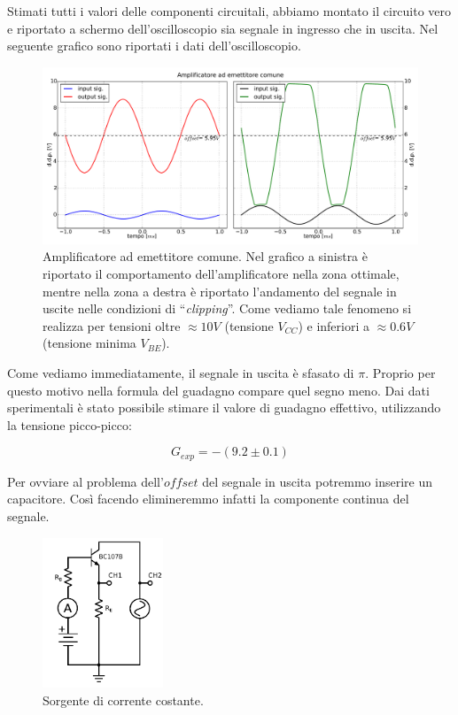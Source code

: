 Stimati tutti i valori delle componenti circuitali, abbiamo montato il circuito vero e riportato a schermo dell'oscilloscopio sia segnale in ingresso che in uscita.
Nel seguente grafico sono riportati i dati dell'oscilloscopio.

\begin{figure}[H]
\centering
	\includegraphics[scale=0.425]{amp.pdf}
	\caption{Amplificatore ad emettitore comune. Nel grafico a sinistra è riportato il comportamento dell'amplificatore nella zona ottimale, mentre nella zona a destra è riportato l'andamento del segnale in uscite nelle condizioni di ``\emph{clipping}''. Come vediamo tale fenomeno si realizza per tensioni oltre $\approx 10V$ (tensione $V_{CC}$) e inferiori a $\approx 0.6V$ (tensione minima $V_{BE}$). }
	\label{fig:amp}
\end{figure}

Come vediamo immediatamente, il segnale in uscita è sfasato di $\pi$.
Proprio per questo motivo nella formula del guadagno compare quel segno meno.
Dai dati sperimentali è stato possibile stimare il valore di guadagno effettivo, utilizzando la tensione picco-picco:

$$G_{exp}=-(9.2 \pm 0.1)$$

Per ovviare al problema dell'$offset$ del segnale in uscita potremmo inserire un capacitore. Così facendo elimineremmo infatti la componente continua del segnale. 

\begin{figure}
	\includegraphics[width=36mm]{cc3.pdf}
	\caption{Sorgente di corrente costante.}
	\label{fig:cc3}
\end{figure}

